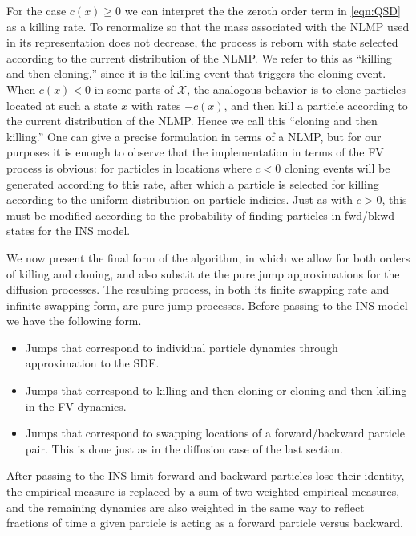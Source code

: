 \documentclass[english,11pt]{article}%
\numberwithin{equation}{section}
\numberwithin{example}{section}
\numberwithin{theorem}{section}
\begin{document}
For the case $c(x)\geq0$ we can interpret the the zeroth order term in
\eqref{eqn:QSD} as a killing rate. To renormalize so that the mass associated
with the NLMP used in its representation does not decrease, the process is
reborn with state selected according to the current distribution of the NLMP.
We refer to this as ``killing and then cloning,'' since it is the killing
event that triggers the cloning event. When $c(x)<0$ in some parts of
$\mathcal{X}$, the analogous behavior is to clone particles located at such a
state $x$ with rates $-c(x)$, and then kill a particle according to the
current distribution of the NLMP. Hence we call this ``cloning and then
killing.'' One can give a precise formulation in terms of a NLMP, but for our
purposes it is enough to observe that the implementation in terms of the FV
process is obvious: for particles in locations where $c<0$ cloning events will
be generated according to this rate, after which a particle is selected for
killing according to the uniform distribution on particle indicies. Just as
with $c>0$, this must be modified according to the probability of finding
particles in fwd/bkwd states for the INS model. \vspace{\baselineskip}

We now present the final form of the algorithm, in which we allow for both
orders of killing and cloning, and also substitute the pure jump
approximations for the diffusion processes. The resulting process, in both its
finite swapping rate and infinite swapping form, are pure jump processes.
Before passing to the INS model we have the following form.  

\begin{itemize}
\item Jumps that correspond to individual particle dynamics through
approximation to the SDE.

\item Jumps that correspond to killing and then cloning or cloning and then
killing in the FV dynamics.

\item Jumps that correspond to swapping locations of a forward/backward
particle pair. This is done just as in the diffusion case of the last section.
\end{itemize}

After passing to the INS limit forward and backward particles lose their identity, the
empirical measure is replaced by a sum of two weighted empirical measures, and
the remaining dynamics are also weighted in the same way to reflect fractions
of time a given particle is acting as a forward particle versus backward.
\end{document}
